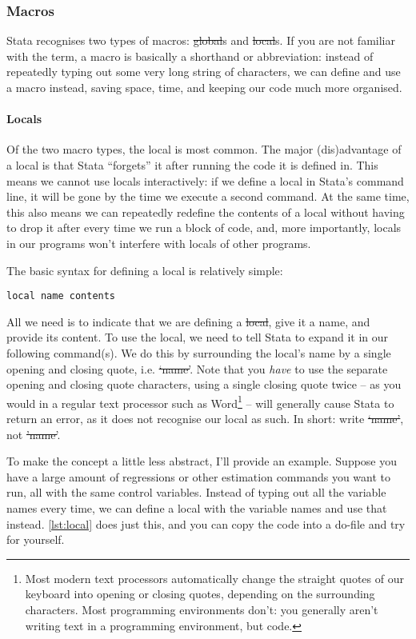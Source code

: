 \subsubsection{Macros}\label{sec:macros}

Stata recognises two types of macros: \st{global}s and \st{local}s.
If you are not familiar with the term,
a macro is basically a shorthand or abbreviation:
instead of repeatedly typing out some very long string of characters,
we can define and use a macro instead, saving space, time,
and keeping our code much more organised.

\paragraph{Locals}
Of the two macro types, the local is most common.
The major (dis)advantage of a local is that Stata ``forgets'' it after running the code it is defined in.
This means we cannot use locals interactively:
if we define a local in Stata's command line,
it will be gone by the time we execute a second command.
At the same time,
this also means we can repeatedly redefine the contents of a local without having to drop it after every time we run a block of code,
and, more importantly, locals in our programs won't interfere with locals of other programs.

The basic syntax for defining a local is relatively simple:
\begin{verbatim}
local name contents
\end{verbatim}
All we need is to indicate that we are defining a \st{local}, give it a name,
and provide its content.
To use the local, we need to tell Stata to expand it in our following command(s).
We do this by surrounding the local's name by a single opening and closing quote, i.e. \st{`name'}.
Note that you \emph{have} to use the separate opening and closing quote characters,
using a single closing quote twice --
as you would in a regular text processor such as Word\footnote{%
Most modern text processors automatically change the straight quotes of our keyboard into opening or closing quotes,
depending on the surrounding characters.
Most programming environments don't:
you generally aren't writing text in a programming environment, but code.} --
will generally cause Stata to return an error,
as it does not recognise our local as such.
In short: write \st{`name'}, not \st{'name'}.

To make the concept a little less abstract, I'll provide an example.
Suppose you have a large amount of regressions or other estimation commands you want to run,
all with the same control variables.
Instead of typing out all the variable names every time,
we can define a local with the variable names and use that instead.
\cref{lst:local} does just this, and you can copy the code into a do-file and try for yourself.

